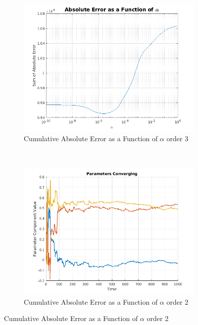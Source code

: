 \documentclass[11pt, fleqn]{article}
\begin{document}
\begin{figure}[!h]
    \centering
    \begin{subfigure}[b]{0.3\textwidth}
        \includegraphics[width=\textwidth]{error-vs-alpha-order-3.png}
	\caption{Cumulative Absolute Error as a Function of $\alpha$ order 3}
	\label{fig:error-vs-alpha-order-3}
    \end{subfigure}
    ~ 
	\begin{subfigure}[b]{0.3\textwidth}
        \includegraphics[width=\textwidth]{kalman-parameter-converge-artificial.png}
	\caption{Cumulative Absolute Error as a Function of $\alpha$ order 2}
	\label{fig:kalman-parameter-converge-artificial}
    \end{subfigure}

\end{figure}
\end{document}
